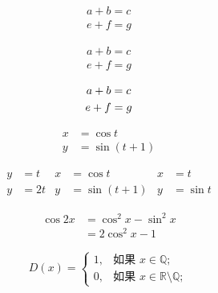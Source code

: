 \documentclass{ctexart}
\begin{document}
	\begin{gather}	%
		a + b = c \\
		e + f = g
	\end{gather}

	\begin{gather*}	%
		a + b = c \\
		e + f = g
	\end{gather*}
	
	\begin{gather}	%
		a + b = c \notag\\
		e + f = g
	\end{gather}
	
	\begin{align}
		x &= \cos t\\
		y &= \sin(t+1)
	\end{align}
	
	\begin{align*}
		y &= t & x &= \cos t & x &= t\\
		y &= 2t & y &= \sin(t+1) & y &= \sin t
	\end{align*}
	
	\begin{equation}
		\begin{split}
			\cos 2x &= \cos^2 x - \sin^2 x \\
					&= 2\cos^2 x -1
		\end{split}
	\end{equation}
	
	\begin{equation}
		D(x) = \begin{cases}	%
					1,& \text{如果 } x \in \mathbb{Q};\\
					0,& \text{如果 } x \in \mathbb{R} \setminus\mathbb{Q};
				\end{cases}
	\end{equation}
	
\end{document}
